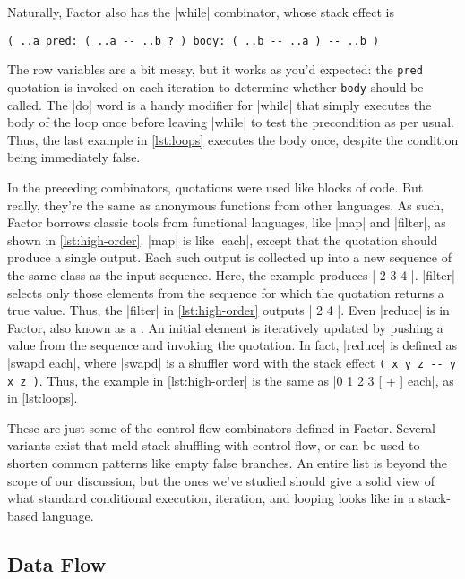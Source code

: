 Naturally, Factor also has the \factor|while| combinator, whose stack effect is
%
\begin{center}
%
  \Verb|( ..a pred: ( ..a -- ..b ? ) body: ( ..b -- ..a ) -- ..b )|
%
\end{center}
%
\noindent The row variables are a bit messy, but it works as you'd expected:
the \Verb|pred| quotation is invoked on each iteration to determine whether
\Verb|body| should be called.  The \factor|do| word is a handy modifier for
\factor|while| that simply executes the body of the loop once before leaving
\factor|while| to test the precondition as per usual.  Thus, the last example
in \vref{lst:loops} executes the body once, despite the condition being
immediately false.


In the preceding combinators, quotations were used like blocks of code.  But
really, they're the same as anonymous functions from other languages.  As such,
Factor borrows classic tools from functional languages, like \factor|map| and
\factor|filter|, as shown in \vref{lst:high-order}.  \factor|map| is like
\factor|each|, except that the quotation should produce a single output.  Each
such output is collected up into a new sequence of the same class as the input
sequence.  Here, the example produces
%
\factor|{ 2 3 4 }|.
%
\factor|filter| selects only those elements from the sequence for which the
quotation returns a true value.  Thus, the \factor|filter| in
\vref{lst:high-order} outputs
%
\factor|{ 2 4 }|.
%
Even \factor|reduce| is in Factor, also known as a .  An
initial element is iteratively updated by pushing a value from the sequence and
invoking the quotation.  In fact, \factor|reduce| is defined as
%
\factor|swapd each|,
%
where \factor|swapd| is a shuffler word with the stack effect
%
\Verb|( x y z -- y x z )|.
%
Thus, the example in \vref{lst:high-order} is the same as
%
\factor|0 { 1 2 3 } [ + ] each|,
%
as in \vref{lst:loops}.

These are just some of the control flow combinators defined in Factor.  Several
variants exist that meld stack shuffling with control flow, or can be used to
shorten common patterns like empty false branches.  An entire list is beyond
the scope of our discussion, but the ones we've studied should give a solid
view of what standard conditional execution, iteration, and looping looks like
in a stack-based language.

\subsection{Data Flow}\label{sec:primer:data-flow}

